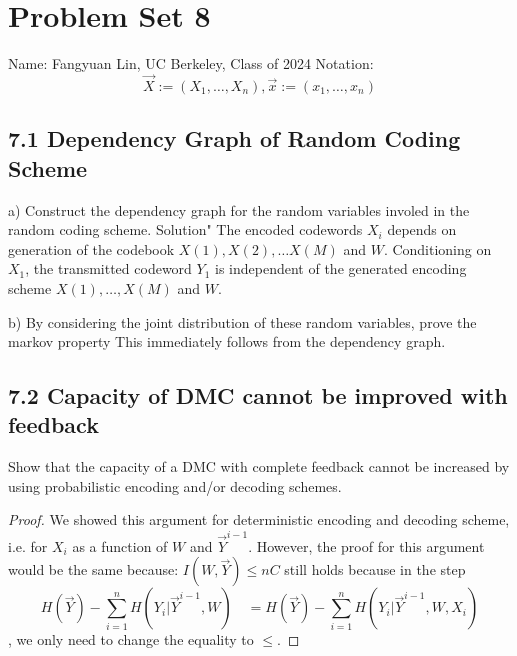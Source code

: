 \documentclass[../main.tex]{subfiles}
\begin{document}
\section*{Problem Set 8}
    Name: Fangyuan Lin, UC Berkeley, Class of 2024
\newline
Notation: \[
\vec X:=(X_1,\dots,X_n), \vec x:=(x_1,\dots,x_n)
\]
\subsection*{7.1 Dependency Graph of Random Coding Scheme} 
a) Construct the dependency graph for the random variables involed in the random coding scheme.
\newline
Solution"
The encoded codewords $X_i$ depends on generation of the codebook $X(1), X(2),\dots X(M)$ and $W$. 
\newline
Conditioning on $X_1$, the transmitted codeword $Y_1$ is independent of the generated encoding scheme $X(1),\dots, X(M)$ and $W$. 
\newline

b) By considering the joint distribution of these random variables, prove the markov property
\newline
This immediately follows from the dependency graph.

\subsection*{7.2 Capacity of DMC cannot be improved with feedback}
Show that the capacity of a DMC with complete feedback cannot be increased by using probabilistic encoding and/or decoding schemes.

\begin{proof}
We showed this argument for deterministic encoding and decoding scheme, i.e. for $X_i$ as a function of $W$ and $\vec Y^{i-1}$. However, the proof for this argument would be the same because:
$I(W,\vec Y)\leq nC$ still holds because in the step \[
H(\vec Y) - \sum_{i=1}^n H(Y_i|\vec Y^{i-1}, W) \quad 
        = H(\vec Y) - \sum_{i=1}^n H(Y_i|\vec Y^{i-1},W,X_i)
\], we only need to change the equality to $\leq$.
\end{proof}
\end{document}
